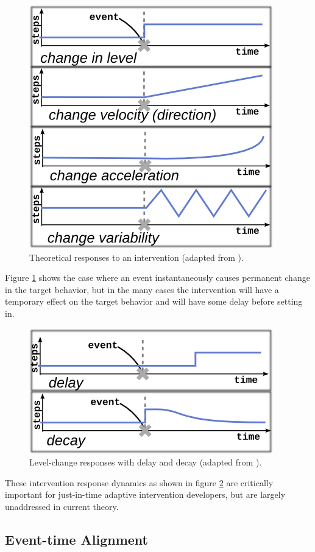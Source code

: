 \documentclass[review,journal]{vgtc}         %
\begin{document}
\begin{figure}
\centering
\includegraphics[width=0.6\columnwidth]{./img/exampleDynamicSignals.png}
\caption{Theoretical responses to an intervention (adapted from \cite{glass1975}).}
\label{fig:exampleSignals}
\end{figure}

Figure \ref{fig:exampleSignals} shows the case where an event instantaneously causes permanent change in the target behavior, but in the many cases the intervention will have a temporary effect on the target behavior and will have some delay before setting in.

\begin{figure}
\centering
\includegraphics[width=0.6\columnwidth]{./img/exampleDynamicComplications.png}
\caption{Level-change responses with delay and decay (adapted from \cite{glass1975}).}
\label{fig:exampleComplications}
\end{figure}

These intervention response dynamics as shown in figure \ref{fig:exampleComplications} are critically important for just-in-time adaptive intervention developers, but are largely unaddressed in current theory.

\subsection{Event-time Alignment}
\end{document}
